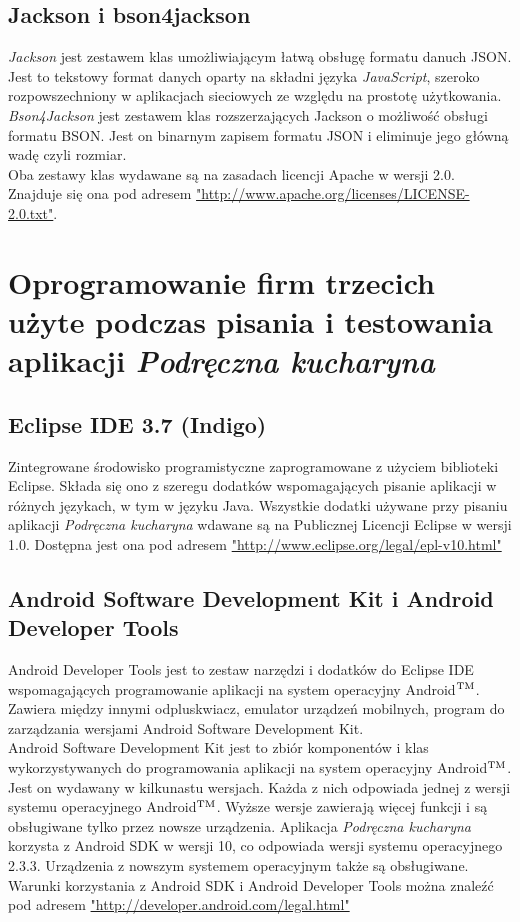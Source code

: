 \documentclass[12pt,leqno, twoside]{mwart}
\def\tm{\leavevmode\hbox{$\rm {}^{TM}$}}
\begin{document}
\subsection{Jackson i bson4jackson}
\emph{Jackson} jest zestawem klas umożliwiającym łatwą obsługę formatu danuch JSON.
Jest to tekstowy format danych oparty na składni języka \emph{JavaScript}, szeroko rozpowszechniony w aplikacjach sieciowych ze względu na prostotę użytkowania. \\
\emph{Bson4Jackson} jest zestawem klas rozszerzających Jackson o możliwość obsługi formatu BSON.
Jest on binarnym zapisem formatu JSON i eliminuje jego główną wadę czyli rozmiar.\\
Oba zestawy klas wydawane są na zasadach licencji Apache w wersji 2.0.
Znajduje się ona pod adresem \url{"http://www.apache.org/licenses/LICENSE-2.0.txt"}.
\section{Oprogramowanie firm trzecich użyte podczas pisania i testowania aplikacji \emph{Podręczna kucharyna}}
\subsection{Eclipse IDE 3.7 (Indigo)}
Zintegrowane środowisko programistyczne zaprogramowane z użyciem biblioteki Eclipse. Składa się ono z szeregu dodatków wspomagających pisanie aplikacji w różnych językach, w tym w języku Java. Wszystkie dodatki używane przy pisaniu aplikacji \emph{Podręczna kucharyna} wdawane są na Publicznej Licencji Eclipse w wersji 1.0.
Dostępna jest ona pod adresem \url{"http://www.eclipse.org/legal/epl-v10.html"}
\subsection{Android Software Development Kit i Android Developer Tools}
Android Developer Tools jest to zestaw narzędzi i dodatków do Eclipse IDE wspomagających programowanie aplikacji na system operacyjny Android\tm. Zawiera między innymi odpluskwiacz, emulator urządzeń mobilnych, program do zarządzania wersjami Android Software Development Kit. \\
Android Software Development Kit jest to zbiór komponentów i klas wykorzystywanych do programowania aplikacji na system operacyjny Android\tm. Jest on wydawany w kilkunastu wersjach. Każda z nich odpowiada jednej z wersji systemu operacyjnego Android\tm. Wyższe wersje zawierają więcej funkcji i są obsługiwane tylko przez nowsze urządzenia.
Aplikacja \emph{Podręczna kucharyna} korzysta z Android SDK w wersji 10, co odpowiada wersji systemu operacyjnego 2.3.3. Urządzenia z nowszym systemem operacyjnym także są obsługiwane. \\
Warunki korzystania z Android SDK i Android Developer Tools można znaleźć pod adresem \url{"http://developer.android.com/legal.html"}
\end{document}
